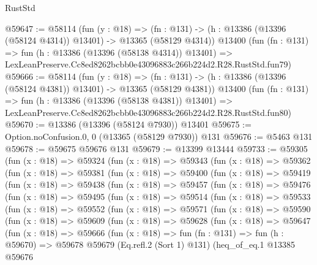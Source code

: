 \begin{lexlean}{RustStd}
\begin{coremodule}
@59647 := @58114
    (fun (y : @18) =>
    (fn : @131) -> (h : @13386 (@13396 (@58124 @4314)) @13401) -> @13365 (@58129 @4314))
    @13400
    (fun (fn : @131) =>
    fun (h : @13386 (@13396 (@58138 @4314)) @13401) =>
    LexLeanPreserve.Cc8ed8262bcbb0e43096883c266b224d2.R28.RustStd.fun79)
@59666 := @58114
    (fun (y : @18) =>
    (fn : @131) -> (h : @13386 (@13396 (@58124 @4381)) @13401) -> @13365 (@58129 @4381))
    @13400
    (fun (fn : @131) =>
    fun (h : @13386 (@13396 (@58138 @4381)) @13401) =>
    LexLeanPreserve.Cc8ed8262bcbb0e43096883c266b224d2.R28.RustStd.fun80)
@59670 := @13386 (@13396 (@58124 @7930)) @13401
@59675 := Option.noConfusion.{0, 0} (@13365 (@58129 @7930)) @131
@59676 := @5463 @131
@59678 := @59675 @59676 @131
@59679 := @13399 @13444
@59733 := @59305
    (fun (x : @18) =>
    @59324
      (fun (x : @18) =>
      @59343
        (fun (x : @18) =>
        @59362
          (fun (x : @18) =>
          @59381
            (fun (x : @18) =>
            @59400
              (fun (x : @18) =>
              @59419
                (fun (x : @18) =>
                @59438
                  (fun (x : @18) =>
                  @59457
                    (fun (x : @18) =>
                    @59476
                      (fun (x : @18) =>
                      @59495
                        (fun (x : @18) =>
                        @59514
                          (fun (x : @18) =>
                          @59533
                            (fun (x : @18) =>
                            @59552
                              (fun (x : @18) =>
                              @59571
                                (fun (x : @18) =>
                                @59590
                                  (fun (x : @18) =>
                                  @59609
                                    (fun (x : @18) =>
                                    @59628
                                      (fun (x : @18) =>
                                      @59647
                                        (fun (x : @18) =>
                                        @59666
                                          (fun (x : @18) =>
                                          fun (fn : @131) =>
                                          fun (h : @59670) =>
                                          @59678
                                            @59679
                                            (Eq.refl.{2} (Sort 1) @131)
                                            (heq_of_eq.{1}
                                              @13385
                                              @59676

\end{coremodule}
\end{lexlean}
